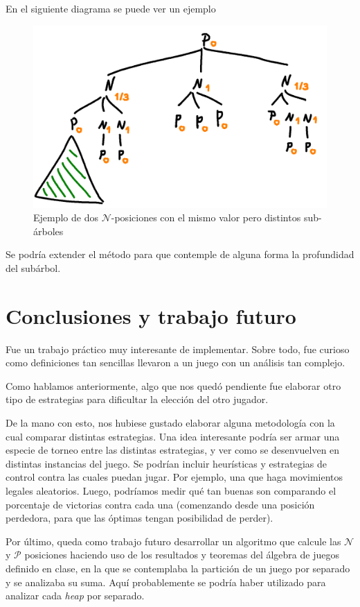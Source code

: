 \documentclass{article}
\newcommand{\calP}{$\mathcal{P}$}
\newcommand{\calN}{$\mathcal{N}$}
\newcommand{\nPositions}{\calN{}-posiciones}
\begin{document}
En el siguiente diagrama se puede ver un ejemplo

\begin{figure}[H]
    \centering
    \includegraphics[scale=0.25]{img/ejemplo.png}
    \caption{Ejemplo de dos \nPositions{} con el mismo valor pero distintos sub-árboles}
\end{figure}

Se podría extender el método para que contemple de alguna forma la profundidad del subárbol. 

\section*{Conclusiones y trabajo futuro}

Fue un trabajo práctico muy interesante de implementar. Sobre todo, fue curioso como definiciones tan sencillas llevaron a un juego con un análisis tan complejo.

Como hablamos anteriormente, algo que nos quedó pendiente fue elaborar otro tipo de estrategias para dificultar la elección del otro jugador.

De la mano con esto, nos hubiese gustado elaborar alguna metodología con la cual comparar distintas estrategias. Una idea interesante podría ser armar una especie de torneo entre las distintas estrategias, y ver como se desenvuelven en distintas instancias del juego. Se podrían incluir heurísticas y estrategias de control contra las cuales puedan jugar. Por ejemplo, una que haga movimientos legales aleatorios. Luego, podríamos medir qué tan buenas son comparando el porcentaje de victorias contra cada una (comenzando desde una posición perdedora, para que las óptimas tengan posibilidad de perder).

Por último, queda como trabajo futuro desarrollar un algoritmo que calcule las \calN{} y \calP{} posiciones haciendo uso de los resultados y teoremas del álgebra de juegos definido en clase, en la que se contemplaba la partición de un juego por separado y se analizaba su suma. Aquí probablemente se podría haber utilizado para analizar cada \textit{heap} por separado.
\end{document}
